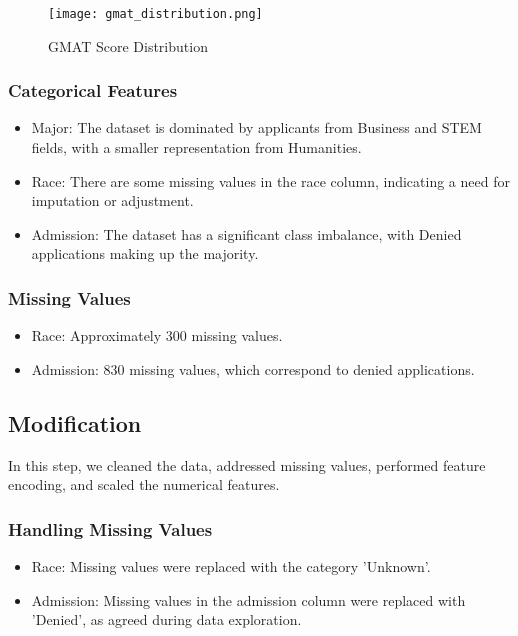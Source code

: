 \documentclass{article}
\begin{document}
\begin{figure}[h]
    \centering
    \texttt{[image: gmat\_distribution.png]}
    \caption{GMAT Score Distribution}
\end{figure}

\subsubsection{Categorical Features}
\begin{itemize}
    \item Major: The dataset is dominated by applicants from Business and STEM fields, with a smaller representation from Humanities.
    \item Race: There are some missing values in the race column, indicating a need for imputation or adjustment.
    \item Admission: The dataset has a significant class imbalance, with Denied applications making up the majority.
\end{itemize}

\subsubsection{Missing Values}
\begin{itemize}
    \item Race: Approximately 300 missing values.
    \item Admission: 830 missing values, which correspond to denied applications.
\end{itemize}

\subsection{Modification}

In this step, we cleaned the data, addressed missing values, performed feature encoding, and scaled the numerical features.

\subsubsection{Handling Missing Values}
\begin{itemize}
    \item Race: Missing values were replaced with the category 'Unknown'.
    \item Admission: Missing values in the admission column were replaced with 'Denied', as agreed during data exploration.
\end{itemize}
\end{document}
